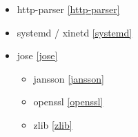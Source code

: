 \begin{itemize}
\item http-parser \ref{http-parser}
\item systemd / xinetd \ref{systemd}
\item jose \ref{jose}
    \begin{itemize}
    \item jansson \ref{jansson}
    \item openssl \ref{openssl}
    \item zlib \ref{zlib}
    \end{itemize}
\end{itemize}
